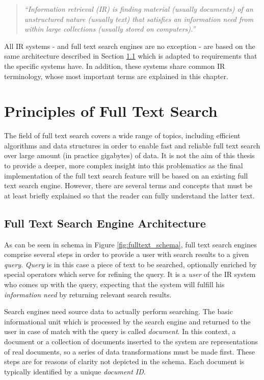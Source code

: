 	\begin{quote}
		\textsl{``Information retrieval (IR) is finding material (usually documents) of an unstructured nature (usually  text) that satisfies an information need from within large collections (usually stored on computers).''}
	\end{quote}

All IR systems - and full text search engines are no exception - are based on the same architecture described in Section \ref{fullTextArch} which is adapted to requirements that the specific systems have. In addition, these systems share common IR terminology, whose most important terms are explained in this chapter.

\section{Principles of Full Text Search}


The field of full text search covers a wide range of topics, including efficient algorithms and data structures in order to enable fast and reliable full text search over large amount (in practice gigabytes) of data. 
It is not the aim of this thesis to provide a deeper, more complex insight into this problematics as the final implementation of the full text search feature will be based on an existing full text search engine. 
However, there are several terms and concepts that must be at least briefly explained so that the reader can fully understand the latter text.


\subsection{Full Text Search Engine Architecture}
\label{fullTextArch}

As can be seen in schema in Figure \ref{fig:fulltext_schema}, full text search engines comprise several steps in order to provide a user with search results to a given \textsl{query}. 
\textsl{Query} is in this case a piece of text to be searched, optionally enriched by special operators which serve for refining the query. 
It is a \textsl{user} of the IR system who comes up with the query, expecting that the system will fulfill his \textsl{information need} by returning relevant search results.

Search engines need source data to actually perform searching. 
The basic informational unit which is processed by the search engine and returned to the user in case of match with the query is called \textsl{document}. 
In this context, a document or a collection of documents inserted to the system are representations of real documents, so a series of data transformations must be made first. 
These steps are for reasons of clarity not depicted in the schema. Each document is typically identified by a unique \textsl{document ID}.
  
